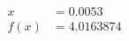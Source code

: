\documentclass[preview]{standalone}
\begin{document}
\begin{align*}
x &= 0.0053\\f(x) &= 4.0163874
\end{align*}
\end{document}
